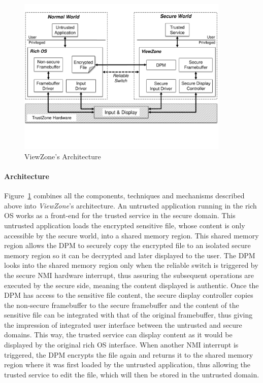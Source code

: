 
\begin{figure}[t!]
	\centering
	\includegraphics[width=0.9\textwidth]{img/viewzone_architecture.pdf}
	\caption{ViewZone's Architecture}
	\label{fig:viewzone_architecture}
\end{figure}

\paragraph{\textbf{Architecture}} Figure~\ref{fig:viewzone_architecture} combines all the components, techniques and mechanisms described above into \emph{ViewZone}'s architecture. An untrusted application running in the rich OS works as a front-end for the trusted service in the secure domain. This untrusted application loads the encrypted sensitive file, whose content is only accessible by the secure world, into a shared memory region. This shared memory region allows the \ac{DPM} to securely copy the encrypted file to an isolated secure memory region so it can be decrypted and later displayed to the user. The \ac{DPM} looks into the shared memory region only when the reliable switch is triggered by the secure \ac{NMI} hardware interrupt, thus assuring the subsequent operations are executed by the secure side, meaning the content displayed is authentic. Once the \ac{DPM} has access to the sensitive file content, the secure display controller copies the non-secure framebuffer to the secure framebuffer and the content of the sensitive file can be integrated with that of the original framebuffer, thus giving the impression of integrated user interface between the untrusted and secure domains. This way, the trusted service can display content as it would be displayed by the original rich OS interface. When another \ac{NMI} interrupt is triggered, the \ac{DPM} encrypts the file again and returns it to the shared memory region where it was first loaded by the untrusted application, thus allowing the trusted service to edit the file, which will then be stored in the untrusted domain.